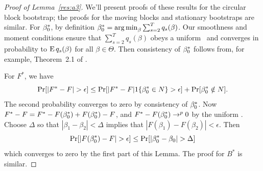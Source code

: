 \documentclass[12pt,fleqn]{article}
\begin{document}
\begin{proof}[Proof of Lemma~\ref{res:a3}]
  We'll present proofs of these results for the circular block
  bootstrap; the proofs for the moving blocks and stationary
  bootstraps are similar. For $\beta_0^*$, by definition $\beta_0^* =
  \operatorname*{arg\,min}_\beta \sum_{s=2}^T q_s(\beta)$. Our smoothness and moment conditions
  ensure that $\sum_{s=2}^T q_s(\beta)$
  obeys a uniform \lln\ and converges in probability to $\operatorname{E}
  q_s(\beta)$ for all $\beta \in \Theta$. Then consistency of
  $\beta_0^*$ follows from, for example, Theorem~2.1 of \cite{NeM:94}.

  For $F^*$, we have
  \begin{equation*}
    \operatorname{Pr}[|F^* - F| > \epsilon] \leq
    \operatorname{Pr}[|F^* - F| 1\{\beta_0^* \in N\} > \epsilon] + \operatorname{Pr}[\beta_0^* \notin N].
  \end{equation*}
  The second probability converges to zero by consistency of
  $\beta_0^*$.  Now $F^* - F = F^* - F(\beta_0^*) + F(\beta_0^*) - F$,
  and $F^* - F(\beta_0^*) \to^p 0$ by the uniform \lln. Choose
  $\Delta$ so that $|\beta_1 - \beta_2| < \Delta$ implies that
  $|F(\beta_1) - F(\beta_2) | < \epsilon$. Then
  \begin{equation*}
     \operatorname{Pr}[|F(\beta_0^*) - F | > \epsilon] \leq \operatorname{Pr}[|\beta_0^* - \beta_0| > \Delta]
  \end{equation*}
  which converges to zero by the first part of this Lemma. The proof
  for $B^*$ is similar.
\end{proof}
\end{document}
